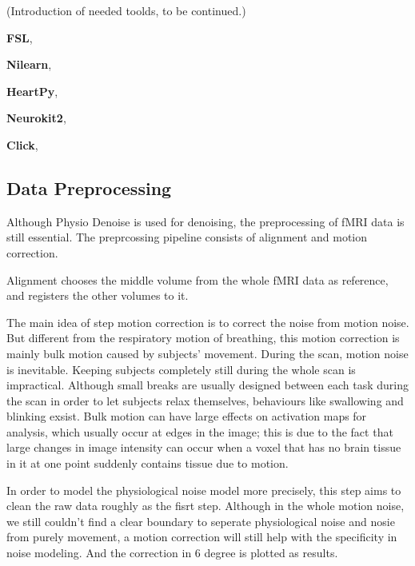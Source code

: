 (Introduction of needed toolds, to be continued.)

\textbf{FSL},

\textbf{Nilearn},


\textbf{HeartPy}\cite{van2019heartpy},

\textbf{Neurokit2}\cite{Makowski2021neurokit},

\textbf{Click},


\subsection{Data Preprocessing}

Although Physio Denoise is used for denoising, the preprocessing of fMRI data is still essential.
The preprcossing pipeline consists of alignment and motion correction.

Alignment chooses the middle volume from the whole fMRI data as reference, and registers the other
volumes to it. 

The main idea of step motion correction is to correct the noise from motion noise. 
But different from the respiratory motion of breathing, this motion correction
is mainly bulk motion caused by subjects' movement. During the scan, motion noise is inevitable. 
Keeping subjects completely still during the whole scan is impractical.
Although small breaks are usually designed between each task during the scan in order to let subjects relax themselves, 
behaviours like swallowing and blinking exsist.
Bulk motion can have large effects on activation maps for analysis, 
which usually occur at edges in the image; 
this is due to the fact that large changes in image intensity can occur 
when a voxel that has no brain tissue in it at one point 
suddenly contains tissue due to motion.\cite{poldrack2011handbook}



In order to model the physiological noise model more precisely, 
this step aims to clean the raw data roughly as the fisrt step.
Although in the whole motion noise, we still couldn't find a clear boundary
to seperate physiological noise and nosie from purely movement, a motion correction will
still help with the specificity in noise modeling. And the correction in 6 degree is plotted 
as results.

